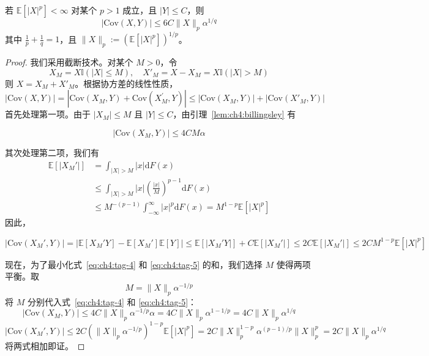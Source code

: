 \begin{lemma}[有界变量的协方差界]\label{lem:ch4:covariance-lp-bound}

若 $\mathbb{E}[|X|^{p}] < \infty$ 对某个 $p > 1$ 成立，且 $|Y| \leq C$，则
\[|\mathrm{Cov}(X, Y)| \leq 6C \|X\|_{p} \alpha^{1/q}\]
其中 $\frac{1}{p} + \frac{1}{q} = 1$，且 $\|X\|_p := (\mathbb{E}[|X|^p])^{1/p}$。

\end{lemma}

\begin{proof}

我们采用截断技术。对某个 $M > 0$，令
\[X_{M} = X\mathbb{I}(|X|\leq M), \quad X'_{M} = X - X_{M} = X\mathbb{I}(|X| > M)\]
则 $X = X_{M} + X'_{M}$。根据协方差的线性性质，
\[|\mathrm{Cov}(X,Y)| = |\mathrm{Cov}(X_{M},Y) + \mathrm{Cov}(X_{M}^{\prime},Y)|\leq |\mathrm{Cov}(X_{M},Y)| + |\mathrm{Cov}(X'_{M},Y)|\]
首先处理第一项。由于 $|X_M| \leq M$ 且 $|Y| \leq C$，由引理~\ref{lem:ch4:billingsley} 有

\begin{equation}
\label{eq:ch4:tag-4}
|\mathrm{Cov}(X_{M},Y)|\leq 4CM\alpha
\end{equation}

其次处理第二项，我们有
\[\begin{aligned} \mathbb{E}[|X_{M}'|] &= \int_{|X| > M}|x|\mathrm{d}F(x) \\ &\leq \int_{|X| > M}|x|\left(\frac{|x|}{M}\right)^{p-1}\mathrm{d}F(x) \\ &\leq M^{-(p-1)}\int_{-\infty}^{\infty} |x|^p \mathrm{d}F(x) = M^{1-p}\mathbb{E}[|X|^{p}] \end{aligned}\]
因此，

\begin{equation}
\label{eq:ch4:tag-5}
|\mathrm{Cov}(X_M',Y)| = |\mathbb{E}[X_M'Y] - \mathbb{E}[X_M']\mathbb{E}[Y]| \leq \mathbb{E}[|X_M'Y|] + C\mathbb{E}[|X_M'|] \leq 2C\mathbb{E}[|X_M'|] \leq 2C M^{1-p}\mathbb{E}[|X|^p]
\end{equation}

现在，为了最小化式~\eqref{eq:ch4:tag-4} 和 \eqref{eq:ch4:tag-5} 的和，我们选择 $M$ 使得两项平衡。取
\[M = \| X\| _p\alpha ^{- 1 / p}\]
将 $M$ 分别代入式~\eqref{eq:ch4:tag-4} 和 \eqref{eq:ch4:tag-5}：
\[|\mathrm{Cov}(X_{M},Y)|\leq 4C \| X\| _p\alpha ^{- 1 / p} \alpha  = 4C \| X\| _p \alpha^{1 - 1/p} = 4C \| X\| _p\alpha^{1/q}\]\[|\mathrm{Cov}(X_M',Y)| \leq 2C \left(\| X\| _p \alpha^{-1/p}\right)^{1-p} \mathbb{E}[|X|^p] = 2C \| X\| _p^{1-p} \alpha^{(p-1)/p} \| X\| _p^p = 2C \| X\| _p \alpha^{1/q}\]
将两式相加即证。

\end{proof}

